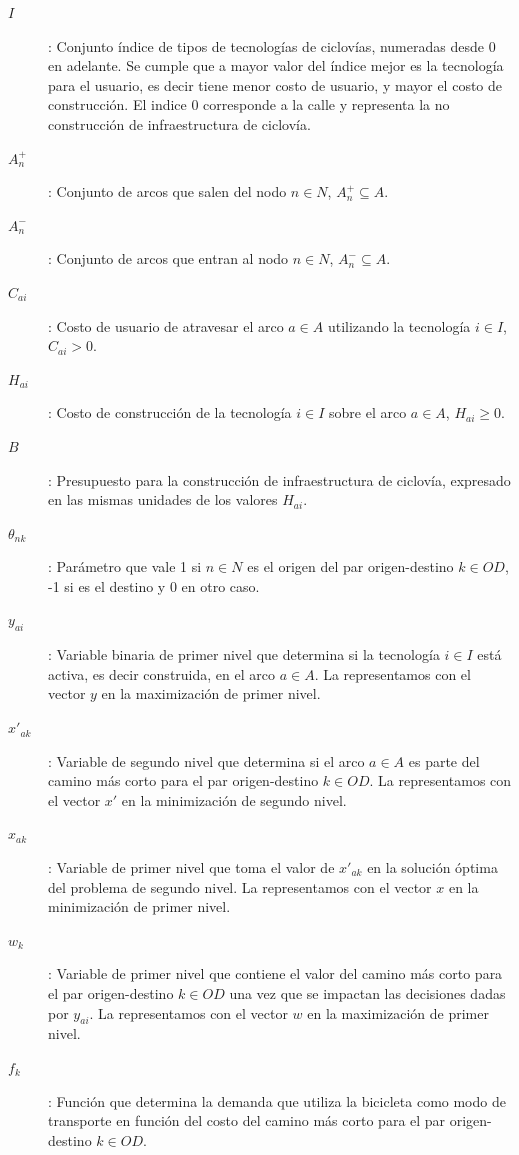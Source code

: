 \begin{description}
  \item[$I$]: Conjunto índice de tipos de tecnologías de ciclovías, numeradas desde $0$ en adelante. Se cumple que a mayor valor del índice mejor es la tecnología para el usuario, es decir tiene menor costo de usuario, y mayor el costo de construcción. El indice 0 corresponde a la calle y representa la no construcción de infraestructura de ciclovía.
  \item[$A_n^+$]: Conjunto de arcos que salen del nodo $n \in N$, $A_n^+ \subseteq A$.
  \item[$A_n^-$]: Conjunto de arcos que entran al nodo $n \in N$, $A_n^- \subseteq A$.
  \item[$C_{ai}$]: Costo de usuario de atravesar el arco $a \in A$ utilizando la tecnología $i \in I$, $C_{ai} > 0$.
  \item[$H_{ai}$]: Costo de construcción de la tecnología $i \in I$ sobre el arco $a \in A$, $H_{ai} \geq 0$.
  \item[$B$]: Presupuesto para la construcción de infraestructura de ciclovía, expresado en las mismas unidades de los valores $H_{ai}$.
  \item[$\theta_{nk}$]: Parámetro que vale 1 si $n \in N$ es el origen del par origen-destino $k \in OD$, -1 si es el destino y 0 en otro caso.
  \item[$y_{ai}$]: Variable binaria de primer nivel que determina si la tecnología $i \in I$ está activa, es decir construida, en el arco $a \in A$. La representamos con el vector $y$ en la maximización de primer nivel.
  \item[$x'_{ak}$]: Variable de segundo nivel que determina si el arco $a \in A$ es parte del camino más corto para el par origen-destino $k \in OD$. La representamos con el vector $x'$ en la minimización de segundo nivel.
  \item[$x_{ak}$]: Variable de primer nivel que toma el valor de $x'_{ak}$ en la solución óptima del problema de segundo nivel. La representamos con el vector $x$ en la minimización de primer nivel.
  \item[$w_k$]: Variable de primer nivel que contiene el valor del camino más corto para el par origen-destino $k \in OD$ una vez que se impactan las decisiones dadas por $y_{ai}$. La representamos con el vector $w$ en la maximización de primer nivel.
  \item[$f_k$]: Función que determina la demanda que utiliza la bicicleta como modo de transporte en función del costo del camino más corto para el par origen-destino $k \in OD$.
\end{description}

